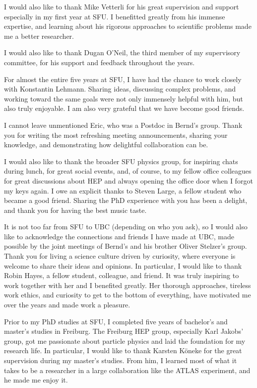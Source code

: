 I would also like to thank Mike Vetterli for his great supervision and support especially in my first year at SFU. 
I benefitted greatly from his immense expertise, and learning about his rigorous approaches to scientific problems made me a better researcher. 

I would also like to thank Dugan O'Neil, the third member of my supervisory committee, for his support and feedback throughout the years. 

For almost the entire five years at SFU, I have had the chance to work closely with Konstantin Lehmann. Sharing ideas, discussing complex problems, and working toward the same goals were not only immensely helpful with him, but also truly enjoyable. I am also very grateful that we have become good friends.

I cannot leave unmentioned Eric, who was a Postdoc in Bernd's group. Thank you for writing the most refreshing meeting announcements, sharing your knowledge, and demonstrating how delightful collaboration can be.

I would also like to thank the broader SFU physics group, for inspiring chats during lunch, for great social events, and, of course, to my fellow office colleagues for great discussions about HEP and always opening the office door when I forgot my keys again. 
I owe an explicit thanks to Steven Large, a fellow student who became a good friend. Sharing the PhD experience with you has been a delight, and thank you for having the best music taste. 

It is not too far from SFU to UBC (depending on who you ask), so I would also like to acknowledge the connections and friends I have made at UBC, made possible by the joint meetings of Bernd's and his brother Oliver Stelzer's group. 
Thank you for living a science culture driven by curiosity, where everyone is welcome to share their ideas and opinions. 
In particular, I would like to thank Robin Hayes, a fellow student, colleague, and friend. It was truly inspiring to work together with her and I benefited greatly. Her thorough approaches, tireless work ethics, and curiosity to get to the bottom of everything, have motivated me over the years and made work a pleasure. 

Prior to my PhD studies at SFU, I completed five years of bachelor's and master's studies in Freiburg. 
The Freiburg HEP group, especially Karl Jakobs' group, got me passionate about particle physics and laid the foundation for my research life.
In particular, I would like to thank Karsten Köneke for the great supervision during my master's studies.
From him, I learned most of what it takes to be a researcher in a large collaboration like the ATLAS experiment, and he made me enjoy it.   

